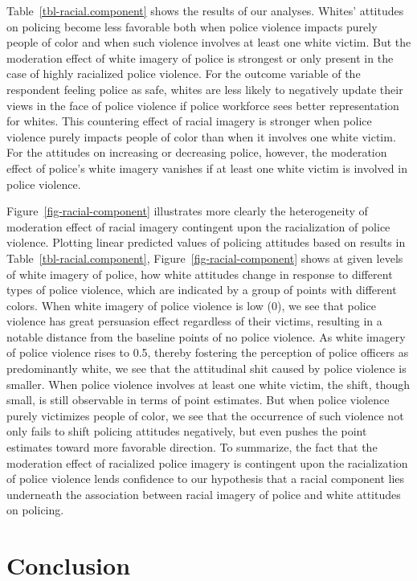 \documentclass[
  12pt,
]{article}
\begin{document}
Table~\ref{tbl-racial.component} shows the results of our analyses.
Whites' attitudes on policing become less favorable both when police
violence impacts purely people of color and when such violence involves
at least one white victim. But the moderation effect of white imagery of
police is strongest or only present in the case of highly racialized
police violence. For the outcome variable of the respondent feeling
police as safe, whites are less likely to negatively update their views
in the face of police violence if police workforce sees better
representation for whites. This countering effect of racial imagery is
stronger when police violence purely impacts people of color than when
it involves one white victim. For the attitudes on increasing or
decreasing police, however, the moderation effect of police's white
imagery vanishes if at least one white victim is involved in police
violence.

Figure~\ref{fig-racial-component} illustrates more clearly the
heterogeneity of moderation effect of racial imagery contingent upon the
racialization of police violence. Plotting linear predicted values of
policing attitudes based on results in Table~\ref{tbl-racial.component},
Figure~\ref{fig-racial-component} shows at given levels of white imagery
of police, how white attitudes change in response to different types of
police violence, which are indicated by a group of points with different
colors. When white imagery of police violence is low (0), we see that
police violence has great persuasion effect regardless of their victims,
resulting in a notable distance from the baseline points of no police
violence. As white imagery of police violence rises to 0.5, thereby
fostering the perception of police officers as predominantly white, we
see that the attitudinal shit caused by police violence is smaller. When
police violence involves at least one white victim, the shift, though
small, is still observable in terms of point estimates. But when police
violence purely victimizes people of color, we see that the occurrence
of such violence not only fails to shift policing attitudes negatively,
but even pushes the point estimates toward more favorable direction. To
summarize, the fact that the moderation effect of racialized police
imagery is contingent upon the racialization of police violence lends
confidence to our hypothesis that a racial component lies underneath the
association between racial imagery of police and white attitudes on
policing.

\hypertarget{conclusion}{%
\section{Conclusion}\label{conclusion}}
\end{document}
